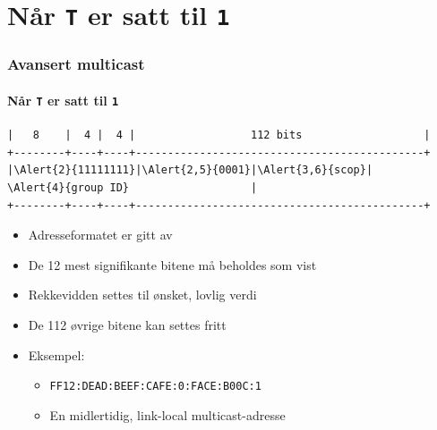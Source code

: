 \section{Når \texttt{T} er satt til \texttt{1}}
\begin{frame}[fragile]
  \frametitle{Avansert multicast}
  \framesubtitle{Når \texttt{T} er satt til \texttt{1}}
\begin{Verbatim}[commandchars=\\\{\},fontsize=\tiny]
|   8    |  4 |  4 |                  112 bits                   |
+--------+----+----+---------------------------------------------+
|\Alert{2}{11111111}|\Alert{2,5}{0001}|\Alert{3,6}{scop}|                  \Alert{4}{group ID}                   |
+--------+----+----+---------------------------------------------+
\end{Verbatim}
  \begin{itemize}
  \item Adresseformatet er gitt av 
  \item \alert<2>{De 12 mest signifikante bitene} må beholdes som vist
  \item \alert<3>{Rekkevidden} settes til ønsket, lovlig verdi
  \item \alert<4>{De 112 øvrige bitene} kan settes fritt
  \item Eksempel:
    \begin{itemize}
    \item \texttt{FF\alert<5>{1}\alert<6>{2}:DEAD:BEEF:CAFE:0:FACE:B00C:1}
    \item En \alert<5>{midlertidig}, \alert<6>{link-local} multicast-adresse
    \end{itemize}
  \end{itemize}
\end{frame}

